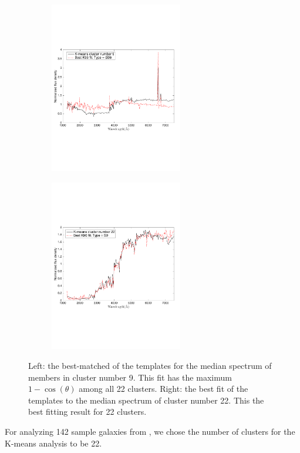     \begin{figure}
                \begin{subfigure}[b]{0.49\textwidth}
                    \centering
                  \includegraphics[width=.99\textwidth, height= 7.5cm]{k_means_images/max_cosine2.pdf}
                \end{subfigure}
                \hfill
                \begin{subfigure}[b]{0.49\textwidth}
                    \centering \includegraphics[width=.99\textwidth, height= 7.5cm]{k_means_images/min_cosine2.pdf}
                \end{subfigure}
                \caption{Left: the best-matched of the  templates for the median spectrum of members in cluster number 9. This fit has the maximum $1-\cos(\theta)$ among all 22 clusters. Right: the best fit of the  templates to the median spectrum of cluster number 22. This the best fitting result for 22 clusters.}
                 \label{fig: k_means_minmax}
    \end{figure}
    For analyzing 142 sample galaxies from , we chose the number of clusters for the K-means analysis to be 22.
